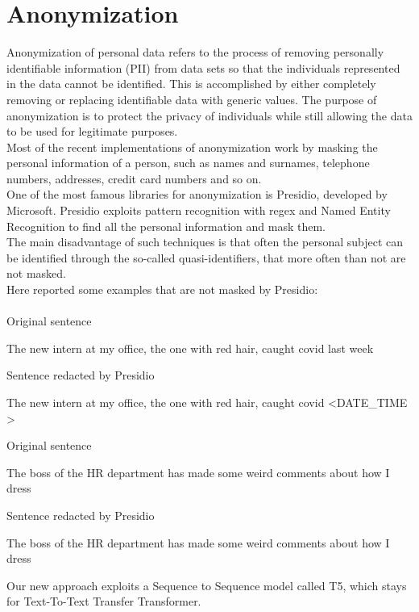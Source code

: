 \clearpage
\section{Anonymization}
\label{sec:anonymization}
Anonymization of personal data refers to the process of removing personally identifiable information (PII) from data sets so that the individuals represented in the data cannot be identified. This is accomplished by either completely removing or replacing identifiable data with generic values. The purpose of anonymization is to protect the privacy of individuals while still allowing the data to be used for legitimate purposes. \\
Most of the recent implementations of anonymization work by masking the personal information of a person, such as names and surnames, telephone numbers, addresses, credit card numbers and so on. \\
One of the most famous libraries for anonymization is Presidio, developed by Microsoft. Presidio exploits pattern recognition with regex and Named Entity Recognition to find all the personal information and mask them. \\
The main disadvantage of such techniques is that often the personal subject can be identified through the so-called quasi-identifiers, that more often than not are not masked.
\\Here reported some examples that are not masked by Presidio:\\ \\
Original sentence
\begin{adjustwidth}{1cm}{}
    The new intern at my office, the one with red hair, caught covid last week 
\end{adjustwidth}
Sentence redacted by Presidio
\begin{adjustwidth}{1cm}{}
    The new intern at my office, the one with red hair, caught covid \textless DATE\_TIME \textgreater
\end{adjustwidth}
Original sentence
\begin{adjustwidth}{1cm}{}
    The boss of the HR department has made some weird comments about how I dress
\end{adjustwidth}
Sentence redacted by Presidio
\begin{adjustwidth}{1cm}{}
    The boss of the HR department has made some weird comments about how I dress 
\end{adjustwidth}
Our new approach exploits a Sequence to Sequence model called T5, which stays for Text-To-Text Transfer Transformer.
